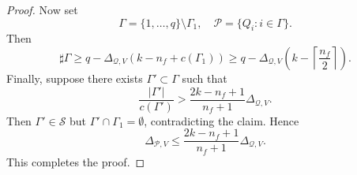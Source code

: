 \documentclass[10pt,a4paper]{amsart}
\begin{document}
\begin{proof}
Now set
$$\Gamma = \{1,\ldots,q\} \setminus \Gamma_1, \quad \mathcal{P} = \{Q_i : i \in \Gamma\}.$$
Then
$$\sharp\Gamma\ge q -\Delta_{\mathcal Q,V}\left(k-n_f+c(\Gamma_1)\right)\ge q -\Delta_{\mathcal Q,V}\left(k-\left\lceil\frac{n_f}{2}\right\rceil\right).$$
Finally, suppose there exists $\Gamma' \subset \Gamma$ such that
$$
\frac{|\Gamma'|}{c(\Gamma')} > \frac{2k-n_f+1}{n_f+1}\Delta_{\mathcal Q,V}.
$$
Then $\Gamma' \in \mathcal{S}$ but $\Gamma' \cap \Gamma_1 = \emptyset$, contradicting the claim. 
Hence
$$\Delta_{\mathcal P,V}\le \frac{2k-n_f+1}{n_f+1}\Delta_{\mathcal Q,V}.$$
This completes the proof.
\end{proof}
\end{document}

